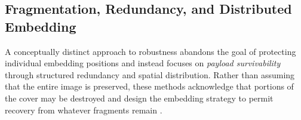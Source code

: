 \documentclass[12pt,a4paper,oneside]{report}
\begin{document}
%	
%	
%	
%	
%	
	\subsection{Fragmentation, Redundancy, and Distributed Embedding}
	\label{subsec:fragmentation}
	
	A conceptually distinct approach to robustness abandons the goal of protecting
	individual embedding positions and instead focuses on \emph{payload survivability}
	through structured redundancy and spatial distribution.
	Rather than assuming that the entire image is preserved, these methods acknowledge that
	portions of the cover may be destroyed and design the embedding strategy to permit
	recovery from whatever fragments remain \cite{petitcolas1999information, cox2007}.
	
\end{document}
